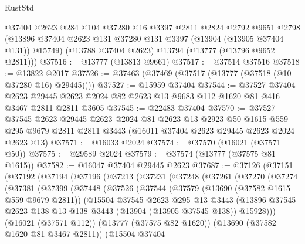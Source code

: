 \begin{lexlean}{RustStd}
\begin{coremodule}
      @37404
      @2623
      @284
      @104
      @37280
      @16
      @3397
      @2811
      @2824
      @2792
      @9651
      @2798
      (@13896 @37404 @2623 @131 @37280 @131 @3397 (@13904 (@13905 @37404 @131)) @15749)
      (@13788 @37404 @2623)
      @13794
      (@13777 (@13796 @9652 @2811)))
@37516 := @13777 (@13813 @9661)
@37517 := @37514 @37516
@37518 := @13822 @2017
@37526 := @37463 (@37469 (@37517 (@13777 (@37518 (@10 @37280 @16) @29445))))
@37527 := @15959 @37404
@37544 := @37527
    @37404
    @2623
    @29445
    @2623
    @2024
    @82
    @2623
    @13
    @9683
    @112
    @1620
    @81
    @416
    @3467
    @2811
    @2811
    @3605
@37545 := @22483 @37404
@37570 := @37527
    @37545
    @2623
    @29445
    @2623
    @2024
    @81
    @2623
    @13
    @2923
    @50
    @1615
    @559
    @295
    @9679
    @2811
    @2811
    @3443
    (@16011 @37404 @2623 @29445 @2623 @2024 @2623 @13)
@37571 := @16033 @2024
@37574 := @37570 (@16021 (@37571 @50))
@37575 := @29589 @2024
@37579 := @37574 (@13777 (@37575 @81 @1615))
@37582 := @16047 @37404 @29445 @2623
@37687 := @37126
    (@37151
      (@37192
        (@37194
          (@37196
            (@37213
              (@37231
                (@37248
                  (@37261
                    (@37270
                      (@37274
                        (@37381
                          (@37399
                            (@37448
                              (@37526
                                (@37544
                                  (@37579
                                    (@13690 (@37582 @1615 @559 @9679 @2811))
                                    (@15504
                                      @37545
                                      @2623
                                      @295
                                      @13
                                      @3443
                                      (@13896
                                        @37545
                                        @2623
                                        @138
                                        @13
                                        @138
                                        @3443
                                        (@13904 (@13905 @37545 @138))
                                        @15928)))
                                  (@16021 (@37571 @112))
                                  (@13777 (@37575 @82 @1620))
                                  (@13690 (@37582 @1620 @81 @3467 @2811))
                                  (@15504
                                    @37404

\end{coremodule}
\end{lexlean}
